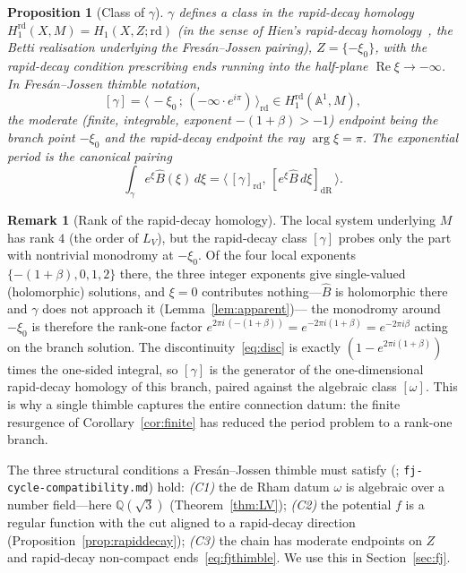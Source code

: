 \documentclass[11pt,reqno]{amsart}
\renewcommand{\_}{\vquadorigunderscore\allowbreak}
\theoremstyle{plain}
\newtheorem{proposition}[theorem]{Proposition}
\theoremstyle{definition}
\newtheorem{remark}[theorem]{Remark}
\newcommand{\Bhat}{\widehat{B}}
\newcommand{\LV}{L_{V}}
\newcommand{\Qsqrt}{\mathbb{Q}(\sqrt3)}
\newcommand{\xizero}{\xi_0}
\begin{document}
\begin{proposition}[Class of $\gamma$]\label{prop:fjclass}
$\gamma$ defines a class in the rapid-decay homology
$H_1^{\mathrm{rd}}(X,M)=H_1(X,Z;\mathrm{rd})$ (in the sense of Hien's rapid-decay
homology~\cite{Hien}, the Betti realisation underlying the Fres\'an--Jossen pairing), $Z=\{-\xizero\}$, with the rapid-decay condition
prescribing ends running into the half-plane $\operatorname{Re}\xi\to-\infty$. In Fres\'an--Jossen
thimble notation,
\begin{equation}\label{eq:fjthimble}
  [\gamma]=\bigl\langle\,-\xizero\,;\,(-\infty\cdot e^{i\pi})\,\bigr\rangle_{\mathrm{rd}}
  \in H_1^{\mathrm{rd}}(\mathbb{A}^1,M),
\end{equation}
the moderate (finite, integrable, exponent $-(1+\beta)>-1$) endpoint being the branch point
$-\xizero$ and the rapid-decay endpoint the ray $\arg\xi=\pi$. The exponential period is the
canonical pairing
\begin{equation}\label{eq:fjpairing}
  \int_\gamma e^{\xi}\Bhat(\xi)\,d\xi
  =\bigl\langle\,[\gamma]_{\mathrm{rd}},\,[e^{\xi}\Bhat\,d\xi]_{\mathrm{dR}}\,\bigr\rangle .
\end{equation}
\end{proposition}

\begin{remark}[Rank of the rapid-decay homology]\label{rmk:rank}
The local system underlying $M$ has rank $4$ (the order of $\LV$), but the rapid-decay class
$[\gamma]$ probes only the part with nontrivial monodromy at $-\xizero$. Of the four local
exponents $\{-(1+\beta),0,1,2\}$ there, the three integer exponents give single-valued
(holomorphic) solutions, and $\xi=0$ contributes nothing---$\Bhat$ is holomorphic there and
$\gamma$ does not approach it (Lemma~\ref{lem:apparent})--- the monodromy around $-\xizero$ is therefore the rank-one
factor $e^{2\pi i\,(-(1+\beta))}=e^{-2\pi i(1+\beta)}=e^{-2\pi i\beta}$ acting on the branch
solution. The discontinuity~\eqref{eq:disc} is exactly $(1-e^{2\pi i(1+\beta)})$ times the
one-sided integral, so $[\gamma]$ is the generator of the one-dimensional rapid-decay homology of
this branch, paired against the algebraic class $[\omega]$. This is why a single thimble captures
the entire connection datum: the finite resurgence of Corollary~\ref{cor:finite} has reduced the
period problem to a rank-one branch.
\end{remark}

The three structural conditions a Fres\'an--Jossen thimble must satisfy
(\cite{FJ}; \texttt{fj-cycle-compatibility.md}) hold: \emph{(C1)} the de Rham datum $\omega$ is
algebraic over a number field---here $\Qsqrt$ (Theorem~\ref{thm:LV}); \emph{(C2)} the potential $f$
is a regular function with the cut aligned to a rapid-decay direction
(Proposition~\ref{prop:rapiddecay}); \emph{(C3)} the chain has moderate endpoints on $Z$ and
rapid-decay non-compact ends~\eqref{eq:fjthimble}. We use this in Section~\ref{sec:fj}.
\end{document}

